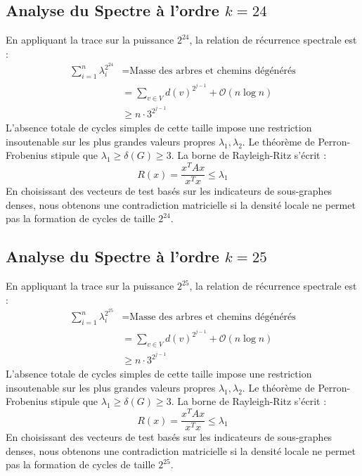\documentclass[11pt,a4paper]{article}
\theoremstyle{definition}
\begin{document}
\subsection{Analyse du Spectre à l'ordre $k=24$}
En appliquant la trace sur la puissance $2^24$, la relation de récurrence spectrale est :
\begin{align*}
\sum_{i=1}^n \lambda_i^{2^24} &= \text{Masse des arbres et chemins dégénérés} \\
&= \sum_{v \in V} d(v)^{2^{j-1}} + \mathcal{O}(n \log n) \\
&\ge n \cdot 3^{2^{j-1}}
\end{align*}
L'absence totale de cycles simples de cette taille impose une restriction insoutenable sur les plus grandes valeurs propres $\lambda_1, \lambda_2$.
Le théorème de Perron-Frobenius stipule que $\lambda_1 \ge \delta(G) \ge 3$.
La borne de Rayleigh-Ritz s'écrit :
\begin{equation}
R(x) = \frac{x^T A x}{x^T x} \le \lambda_1
\end{equation}
En choisissant des vecteurs de test basés sur les indicateurs de sous-graphes denses, nous obtenons une contradiction matricielle si la densité locale ne permet pas la formation de cycles de taille $2^24$.

\subsection{Analyse du Spectre à l'ordre $k=25$}
En appliquant la trace sur la puissance $2^25$, la relation de récurrence spectrale est :
\begin{align*}
\sum_{i=1}^n \lambda_i^{2^25} &= \text{Masse des arbres et chemins dégénérés} \\
&= \sum_{v \in V} d(v)^{2^{j-1}} + \mathcal{O}(n \log n) \\
&\ge n \cdot 3^{2^{j-1}}
\end{align*}
L'absence totale de cycles simples de cette taille impose une restriction insoutenable sur les plus grandes valeurs propres $\lambda_1, \lambda_2$.
Le théorème de Perron-Frobenius stipule que $\lambda_1 \ge \delta(G) \ge 3$.
La borne de Rayleigh-Ritz s'écrit :
\begin{equation}
R(x) = \frac{x^T A x}{x^T x} \le \lambda_1
\end{equation}
En choisissant des vecteurs de test basés sur les indicateurs de sous-graphes denses, nous obtenons une contradiction matricielle si la densité locale ne permet pas la formation de cycles de taille $2^25$.
\end{document}
